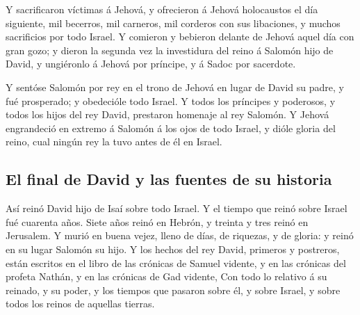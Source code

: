  Y sacrificaron víctimas á Jehová, y ofrecieron á Jehová
holocaustos el día siguiente, mil becerros, mil carneros, mil corderos
con sus libaciones, y muchos sacrificios por todo Israel. 
Y comieron y bebieron delante de Jehová aquel día con gran gozo; y
dieron la segunda vez la investidura del reino á Salomón hijo de David,
y ungiéronlo á Jehová por príncipe, y á Sadoc por sacerdote.

 Y sentóse Salomón por rey en el trono de Jehová en lugar
de David su padre, y fué prosperado; y obedecióle todo Israel.
 Y todos los príncipes y poderosos, y todos los hijos del
rey David, prestaron homenaje al rey Salomón.  Y Jehová
engrandeció en extremo á Salomón á los ojos de todo Israel, y dióle
gloria del reino, cual ningún rey la tuvo antes de él en Israel.

\hypertarget{el-final-de-david-y-las-fuentes-de-su-historia}{%
\subsection{El final de David y las fuentes de su
historia}\label{el-final-de-david-y-las-fuentes-de-su-historia}}

 Así reinó David hijo de Isaí sobre todo Israel.
 Y el tiempo que reinó sobre Israel fué cuarenta años.
Siete años reinó en Hebrón, y treinta y tres reinó en Jerusalem.
 Y murió en buena vejez, lleno de días, de riquezas, y de
gloria: y reinó en su lugar Salomón su hijo.  Y los hechos
del rey David, primeros y postreros, están escritos en el libro de las
crónicas de Samuel vidente, y en las crónicas del profeta Nathán, y en
las crónicas de Gad vidente,  Con todo lo relativo á su
reinado, y su poder, y los tiempos que pasaron sobre él, y sobre Israel,
y sobre todos los reinos de aquellas tierras.
